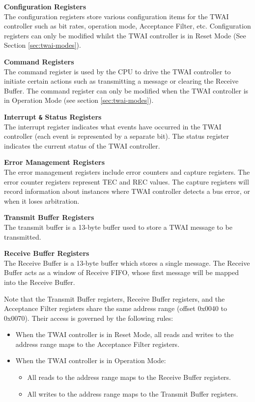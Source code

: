 \documentclass[main\_\_EN.tex]{subfiles}
\begin{document}
{\bfseries Configuration Registers}\\
The configuration registers store various configuration items for the TWAI controller such as bit rates, operation mode, Acceptance Filter, etc. Configuration registers can only be modified whilst the TWAI controller is in Reset Mode (See Section \ref{sec:twai-modes}).

{\bfseries Command Registers}\\
The command register is used by the CPU to drive the TWAI controller to initiate certain actions such as transmitting a message or clearing the Receive Buffer. The command register can only be modified when the TWAI controller is in Operation Mode (see section \ref{sec:twai-modes}).

{\bfseries Interrupt \verb+&+ Status Registers}\\
The interrupt register indicates what events have occurred in the TWAI controller (each event is represented by a separate bit). The status register indicates the current status of the TWAI controller.

{\bfseries Error Management Registers}\\
The error management registers include error counters and capture registers. The error counter registers represent TEC and REC values. The capture registers will record information about instances where TWAI controller detects a bus error, or when it loses arbitration.

{\bfseries Transmit Buffer Registers}\\
The transmit buffer is a 13-byte buffer used to store a TWAI message to be transmitted.

{\bfseries Receive Buffer Registers}\\
The Receive Buffer is a 13-byte buffer which stores a single message. The Receive Buffer acts as a window of Receive FIFO, whose first message will be mapped into the Receive Buffer.

Note that the Transmit Buffer registers, Receive Buffer registers, and the Acceptance Filter registers share the same address range (offset 0x0040 to 0x0070). Their access is governed by the following rules:

\begin{itemize}
    \item When the TWAI controller is in Reset Mode, all reads and writes to the address range maps to the Acceptance Filter registers.
    \item When the TWAI controller is in Operation Mode:
    \begin{itemize}
        \item All reads to the address range maps to the Receive Buffer registers.
        \item All writes to the address range maps to the Transmit Buffer registers.
    \end{itemize}
\end{itemize}
\end{document}
